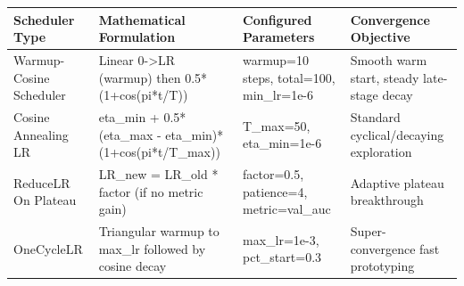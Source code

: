 \begin{tabular}{llll}
\toprule
Scheduler Type & Mathematical Formulation & Configured Parameters & Convergence Objective \\
\midrule
Warmup-Cosine Scheduler & Linear 0->LR (warmup) then 0.5*(1+cos(pi*t/T)) & warmup=10 steps, total=100, min\_lr=1e-6 & Smooth warm start, steady late-stage decay \\
Cosine Annealing LR & eta\_min + 0.5*(eta\_max - eta\_min)*(1+cos(pi*t/T\_max)) & T\_max=50, eta\_min=1e-6 & Standard cyclical/decaying exploration \\
ReduceLR On Plateau & LR\_new = LR\_old * factor (if no metric gain) & factor=0.5, patience=4, metric=val\_auc & Adaptive plateau breakthrough \\
OneCycleLR & Triangular warmup to max\_lr followed by cosine decay & max\_lr=1e-3, pct\_start=0.3 & Super-convergence fast prototyping \\
\bottomrule
\end{tabular}
